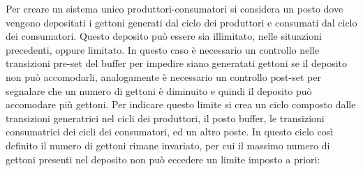 \documentclass{article}
\numberwithin{equation}{subsection}
\begin{document}
Per creare un sistema unico produttori-consumatori si considera un posto dove vengono depositati i gettoni generati dal ciclo dei produttori e consumati dal ciclo dei 
consumatori. Questo deposito può essere sia illimitato, nelle situazioni precedenti, oppure limitato. In questo caso è necessario un controllo nelle transizioni pre-set 
del buffer per impedire siano generatati gettoni se il deposito non può accomodarli, analogamente è necessario un controllo post-set per segnalare che un numero di gettoni è 
diminuito e quindi il deposito può accomodare più gettoni. Per indicare questo limite si crea un ciclo composto dalle transizioni generatrici nel cicli dei produttori, 
il posto buffer, le transizioni consumatrici dei cicli dei consumatori, ed un altro poste. In questo ciclo così definito il numero di gettoni rimane invariato, per cui il 
massimo numero di gettoni presenti nel deposito non può eccedere un limite imposto a priori:


\begin{center}
\end{center}
\end{document}
